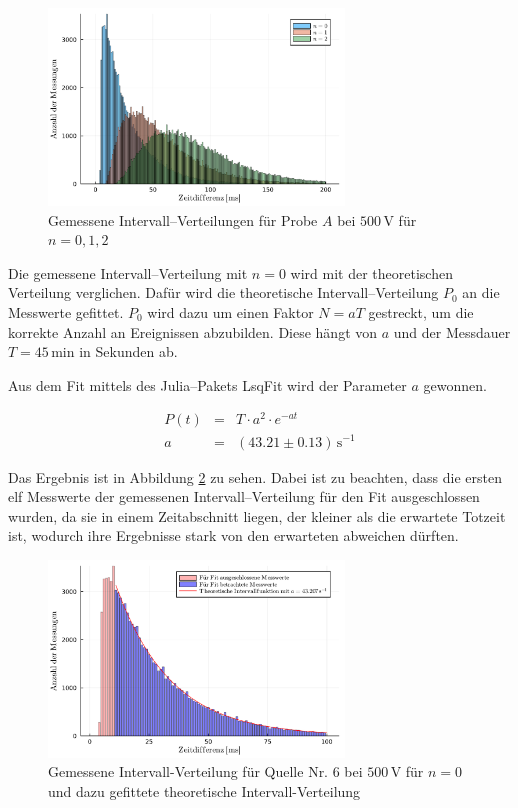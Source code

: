 \documentclass[12pt,a4paper]{scrartcl}
\numberwithin{equation}{section} %
\newcommand{\code}[1]{\textsf{#1}}
\begin{document}
\begin{figure}[h]
	\centering
	\includegraphics[width=0.7\textwidth]{../media/B3.1/interval.pdf}
	\caption{Gemessene Intervall--Verteilungen für Probe $A$ bei $500 \mathrm{\, V}$ für $n = 0,1,2$}
	\label{fig:interval}
\end{figure}

\noindent
Die gemessene Intervall--Verteilung mit $n = 0$ wird mit der theoretischen Verteilung verglichen. Dafür wird die theoretische Intervall--Verteilung $P_0$ an die Messwerte gefittet. $P_0$ wird dazu um einen Faktor $N=aT$ gestreckt, um die korrekte Anzahl an Ereignissen abzubilden. Diese hängt von $a$ und der Messdauer $T=45\mathrm{\,min}$ in Sekunden ab.

Aus dem Fit mittels des \code{Julia}--Pakets \code{LsqFit} \cite{Julia:LsqFit} wird der Parameter $a$ gewonnen.

\begin{eqnarray}
	P(t) &=& T \cdot a^2 \cdot e^{-at} \\
	a &=& (43.21 \pm 0.13) \mathrm{\,s^{-1}}
\end{eqnarray}

\noindent
Das Ergebnis ist in Abbildung \ref{fig:intervalFit} zu sehen. Dabei ist zu beachten, dass die ersten elf Messwerte der gemessenen Intervall--Verteilung für den Fit ausgeschlossen wurden, da sie in einem Zeitabschnitt liegen, der kleiner als die erwartete Totzeit ist, wodurch ihre Ergebnisse stark von den erwarteten abweichen dürften.

\begin{figure}
	\centering
	\includegraphics[width=0.7\textwidth]{../media/B3.1/intervalFit.pdf}
	\caption{Gemessene Intervall-Verteilung für Quelle Nr. 6 bei $500 \mathrm{\, V}$ für $n = 0$ und dazu gefittete theoretische Intervall-Verteilung}
	\label{fig:intervalFit}
\end{figure}
\end{document}
